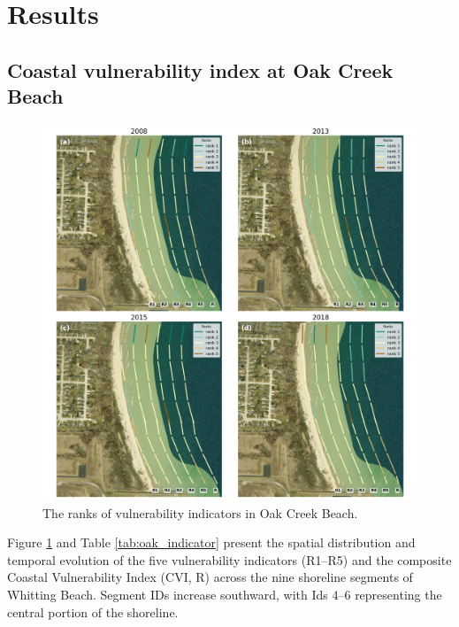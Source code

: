\section{Results}
\label{c5_Results}

\subsection{Coastal vulnerability index at Oak Creek Beach}
\label{Coastal vulnerability index at Oak Creek Beach}

\begin{figure}[htbp]
  \centering
  \includegraphics[width=1\textwidth]{chapter5/resources/site1_cvi.png}
  \caption{The ranks of vulnerability indicators in Oak Creek Beach.}
  \label{fig:s1_cv1}
\end{figure}

Figure \ref{fig:s1_cv1} and Table \ref{tab:oak_indicator} present the
spatial distribution and temporal evolution of the five vulnerability indicators
(R1–R5) and the composite Coastal Vulnerability Index (CVI, R) across the nine
shoreline segments of Whitting Beach. Segment IDs increase southward, with Ids
4–6 representing the central portion of the shoreline.

